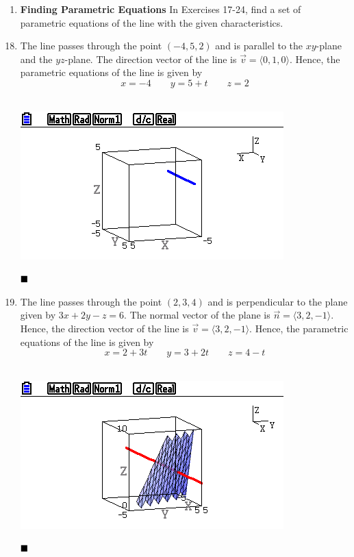 \newpage
\begin{enumerate}[label={}, leftmargin=*]
    \item \textbf{Finding Parametric Equations} In Exercises 17-24, find a set of parametric equations of the line with the given characteristics.
\end{enumerate}

\begin{enumerate}
    \setcounter{enumi}{17}
    \item The line passes through the point $(-4, 5, 2)$ and is parallel to the
          $xy$-plane and the $yz$-plane. \sol{} The direction vector of the line is
          $\vec{v} = \langle 0, 1, 0 \rangle$. Hence, the parametric equations of the
          line is given by \[x = -4 \qquad y = 5 + t \qquad z = 2\]\\

          \begin{center}
              \includegraphics[scale=0.5]{assets/larson11.5q18graph.png}
          \end{center}$\hfill\blacksquare$

    \item The line passes through the point $(2,3,4)$ and is perpendicular to the plane
          given by $3 x+2 y-z=6$. \sol{} The normal vector of the plane is $\vec{n} =
              \langle 3, 2, -1 \rangle$. Hence, the direction vector of the line is $\vec{v}
              = \langle 3, 2, -1 \rangle$. Hence, the parametric equations of the line is
          given by \[x = 2 + 3t \qquad y = 3 + 2t \qquad z = 4 - t\]\\

          \begin{center}
              \includegraphics[scale=0.5]{assets/larson11.5q19graph.png}
          \end{center}$\hfill\blacksquare$
\end{enumerate}

